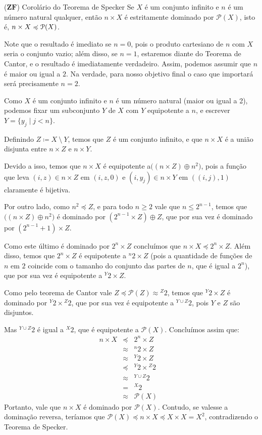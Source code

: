 \documentclass{hipatia}
\newcommand{\n}{\noindent}
\newcommand{\dem}{\n{\bf Demonstração: }}
\newcommand{\partes}[1]{\mathcal{P}(#1)}
\newcommand{\nback}[1][-.95pt]{
  \mathrel{\raisebox{#1}{$\rotatebox[origin=c]{-315}{\scaleobj{0.55}{-}}$}}
}
\newcommand{\preccurlyneq}{%
\mathrel{\ooalign{$\preccurlyeq$\cr\kern1.2pt$\nback$}}}
\newcommand{\zf}{\mathbf{ZF}}
\begin{document}
\begin{teoremacaixa*}{($\zf$) Corolário do Teorema
de Specker} Se $X$ é um conjunto infinito e $n$
é um número natural qualquer, então $n\times X$
é estritamente dominado por $\partes{X}$, isto
é, $n\times X\preccurlyneq\partes{X}$.
\end{teoremacaixa*}

Note que o resultado é imediato se $n=0$, pois o
produto cartesiano de $n$ com $X$ seria o conjunto
vazio; além disso, se $n=1$, estaremos diante do
Teorema de Cantor, e o resultado é imediatamente
verdadeiro. Assim, podemos assumir que $n$ é maior
ou igual a $2$. Na verdade, para nosso objetivo
final o caso que importará será precisamente
$n=2$.

\dem Como $X$ é um conjunto infinito e $n$ é um
número natural (maior ou igual a 2), podemos fixar
um subconjunto $Y$ de $X$ com $Y$ equipotente a
$n$, e escrever $Y=\{y_j\mid j<n\}$.

Definindo $Z\coloneq X~\setminus~Y$, temos que $Z$ é um
conjunto infinito, e que $n\times X$ é a união
disjunta entre $n\times Z$ e $n\times Y$.

Devido a isso, temos que $n\times X$ é equipotente
a\linebreak $\big((n\times Z)\oplus n^2\big)$, pois a função
que leva $(i,z)\in n\times Z$ em $(i,z,0)$ e
$(i,y_j)\in n\times Y$ em $((i,j),1)$ claramente é
bijetiva.

Por outro lado, como $n^2\preccurlyeq Z$, e para
todo $n\geq 2$ vale que $n\leq 2^{n-1}$, temos que
$\big((n\times Z)\oplus n^2\big)$ é dominado por
$(2^{n-1}\times Z)\oplus Z$, que por sua vez é
dominado por $(2^{n-1}+1)\times Z$.

Como este último é dominado por $2^n\times Z$
concluímos que $n\times X\preccurlyeq 2^n\times
Z.$ Além disso, temos que $2^n\times Z$ é
equipotente a $^n2\times Z$ (pois a quantidade de
funções de $n$ em $2$ coincide com o tamanho do
conjunto das partes de $n$, que é igual a $2^n$),
que por sua vez é equipotente a $^Y2\times Z$.

Como pelo teorema de Cantor vale
$Z\preccurlyeq\partes{Z}\approx {}^Z2$, temos que
$^Y2\times Z$ é dominado por $^Y2\times{}^Z2$, que
por sua vez é equipotente a $^{Y\cup Z}2$, pois
$Y$ e $Z$ são disjuntos.

Mas $^{Y\cup Z}2$ é igual a $^X2$, que é
equipotente a $\partes{X}$. Concluímos assim que:
$$\begin{matrix} n\times X&\preccurlyeq&2^n\times
Z \\&\approx&{}^n2\times Z
\\&\approx&{}^Y2\times Z&
\\&\preccurlyeq&{}^Y2\times {}^Z2
\\&\approx&{}^{Y\cup Z}2& \\&=&{}^X2&
\\&\approx&\mathcal{P}(X) \end{matrix}$$ Portanto,
vale que $n\times X$ é dominado por $\partes{X}$.
Contudo, se valesse a dominação reversa, teríamos
que $\mathcal{P}(X)\preccurlyeq n\times X
\preccurlyeq X\times X=X^2$, contradizendo o
Teorema de Specker.
\end{document}
